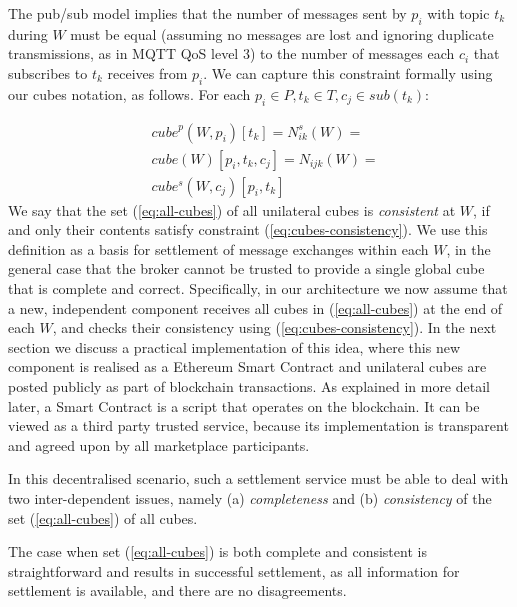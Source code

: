\documentclass[chi_draft]{sigchi}
\begin{document}
The pub/sub model implies that the number of messages sent by $p_i$ with topic $t_k$ during $W$ must be equal (assuming no messages are lost and ignoring duplicate transmissions, as in MQTT QoS level 3) to the number of messages each $c_i$ that subscribes to $t_k$ receives from $p_i$. 
We can capture this constraint formally using our cubes notation, as follows.
%
For each $ p_i \in P, t_k \in T, c_j \in \mathit{sub}(t_k)$:
{\begin{equation}\label{eq:cubes-consistency}
\begin{split}
& \mathit{cube}^p(W, p_i)[t_k] = N^s_{ik}(W) = \\
& \mathit{cube}(W)[p_i, t_k, c_j]  = N_{ijk}(W) = \\
& \mathit{cube^s}(W, c_j)[p_i, t_k]
\end{split}
\end{equation}
We say that the set (\ref{eq:all-cubes}) of all unilateral cubes is \textit{consistent} at $W$, if and only their contents satisfy constraint (\ref{eq:cubes-consistency}).
We use this definition as a basis for settlement of message exchanges within each $W$, in the general case that the broker cannot be trusted to provide a single global cube that is complete and correct.
%
Specifically, in our architecture we  now assume that a new, independent component receives all cubes in (\ref{eq:all-cubes}) at the end of each $W$, and checks their consistency using (\ref{eq:cubes-consistency}). 
In the next section we discuss a practical implementation of this idea, where this new component is realised as a Ethereum Smart Contract and unilateral cubes are posted publicly as part of blockchain transactions. As explained in more detail later, a Smart Contract is a script that operates on the blockchain.   
It can be viewed as a third party trusted service, because its implementation is transparent and agreed upon by all marketplace participants.

In this decentralised scenario, such a settlement service must be able to deal with two inter-dependent issues, namely (a) \textit{completeness} and (b) \textit{consistency} of the set (\ref{eq:all-cubes}) of all cubes.

The case when set (\ref{eq:all-cubes}) is both complete and consistent is straightforward and results in successful settlement, as all information for settlement is available, and there are no disagreements.

}
\end{document}
